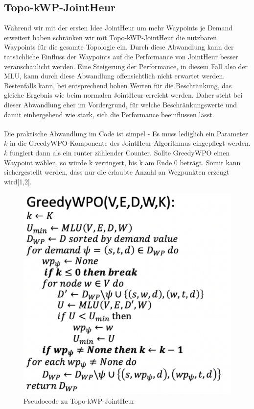 \documentclass[sigconf,noacm,review]{acmart}
\begin{document}
\subsection{Topo-kWP-JointHeur}
Während wir mit der ersten Idee JointHeur um mehr Waypoints je Demand erweitert haben schränken wir mit Topo-kWP-JointHeur die nutzbaren Waypoints für die gesamte Topologie ein.
Durch diese Abwandlung kann der tatsächliche Einfluss der Waypoints auf die Performance von JointHeur besser veranschaulicht werden. Eine Steigerung der Performance, in diesem Fall also der MLU, kann durch diese Abwandlung offensichtlich nicht erwartet werden. 
Bestenfalls kann, bei entsprechend hohen Werten für die Beschränkung, das gleiche Ergebnis wie beim normalen JointHeur erreicht werden.
Daher steht bei dieser Abwandlung eher im Vordergrund, für welche Beschränkungswerte und damit einhergehend wie stark, sich die Performance beeinflussen lässt. \\
\\
Die praktische Abwandlung im Code ist simpel - Es muss lediglich ein Parameter $k$ in die 
GreedyWPO-Komponente des JointHeur-Algorithmus eingepflegt werden. $k$ fungiert dann als ein runter zählender Counter. Sollte GreedyWPO
einen Waypoint wählen, so würde k verringert, bis k am Ende 0 beträgt. Somit kann sichergestellt werden, dass nur die
erlaubte Anzahl an Wegpunkten erzeugt wird[1,2].
\\
\begin{figure}[h]
  \centering
  \includegraphics[width=\linewidth]{abbildungen/pseudo2}
  \caption{Pseudocode zu Topo-kWP-JointHeur}
\end{figure}
\end{document}

